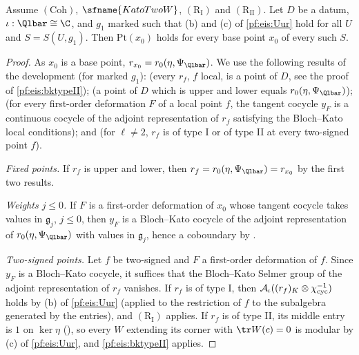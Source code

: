\begin{lemma}\label{pf:eis:pthyp}
Assume $(\mathrm{Coh})$, $\sfname{KatoTwoW}$, $(\mathrm{R}_{\mathrm{I}})$ and $(\mathrm{R}_{\mathrm{II}})$. Let $D$ be a datum, $\iota:\Qlbar\cong\C$, and $g_1$
marked such that (b) and (c) of \cref{pf:eis:Uur} hold for all $U$ and $S=S(U,g_1)$. Then $\mathrm{Pt}(x_0)$ holds for every
base point $x_0$ of every such $S$.
\end{lemma}

\begin{proof}
As $x_0$ is a base point, $r_{x_0}=\eisrz(\eta,\Psi_{\Qlbar})$. We use the following results of the development (for marked $g_1$):
 (every $r_f$, $f$ local, is a point of $D$, see the proof of \cref{pf:eis:bktypeII});
 (a point of $D$ which is upper and lower equals $\eisrz(\eta,\Psi_{\Qlbar})$);
 (for every first-order deformation $F$ of a local point $f$, the tangent cocycle $y_F$ is a
continuous cocycle of the adjoint representation of $r_f$ satisfying the Bloch--Kato local conditions); and
 (for $\ell\ne2$, $r_f$ is of type I or of type II at every two-signed point $f$).

\emph{Fixed points.} If $r_f$ is upper and lower, then $r_f=\eisrz(\eta,\Psi_{\Qlbar})=r_{x_0}$ by the first two results.

\emph{Weights $j\le0$.} If $F$ is a first-order deformation of $x_0$ whose tangent cocycle takes values in $\mathfrak g_j$, $j\le0$,
then $y_F$ is a Bloch--Kato cocycle of the adjoint representation of $\eisrz(\eta,\Psi_{\Qlbar})$ with values in $\mathfrak g_j$, hence a
coboundary by .

\emph{Two-signed points.} Let $f$ be two-signed and $F$ a first-order deformation of $f$. Since $y_F$ is a Bloch--Kato cocycle, it
suffices that the Bloch--Kato Selmer group of the adjoint representation of $r_f$ vanishes. If $r_f$ is of type I, then
$\mathcal A_\iota((r_f)_K\otimes\chi_{\mathrm{cyc}}^{-1})$ holds by (b) of \cref{pf:eis:Uur} (applied to the restriction of $f$ to the subalgebra
generated by the entries), and $(\mathrm{R}_{\mathrm{I}})$ applies. If $r_f$ is of type II, its middle entry is $1$ on $\ker\eta$
(), so every $W$ extending its corner with $\tr W(c)=0$ is modular by (c) of
\cref{pf:eis:Uur}, and \cref{pf:eis:bktypeII} applies.
\end{proof}

